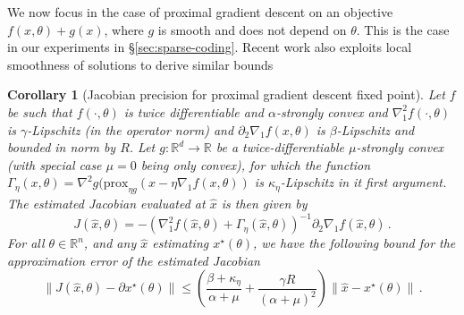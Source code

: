 \documentclass{article}
\def\RR{{\mathbb R}}
\def\prox{{\text{prox}}}
\newtheorem{corollary}{Corollary}
\begin{document}
We now focus in the case of proximal gradient descent on an objective
$f(x,\theta) + g(x)$, where $g$ is smooth and does not depend
on $\theta$. This is the case in our experiments in \S\ref{sec:sparse-coding}.
Recent work also exploits local smoothness of solutions to derive similar bounds
\cite[Theorem 13]{bertrand_2021_journal}

\begin{corollary}[Jacobian precision for proximal gradient descent fixed point]
\label{cor:precision-prox}
    Let $f$ be such that $f(\cdot, \theta)$ is twice differentiable and
    $\alpha$-strongly convex and $\nabla_1^2f(\cdot, \theta)$ is
    $\gamma$-Lipschitz (in the operator norm) and $\partial_2\nabla_1 f(x,
    \theta)$ is $\beta$-Lipschitz and bounded in norm by $R$. Let $g: \RR^d \to
    \RR$ be a twice-differentiable $\mu$-strongly convex (with special case $\mu =0$ being only convex), for which the function
    $\Gamma_\eta(x, \theta) =  \nabla^2 g(\prox_{\eta g}(x - \eta \nabla_1 f(x,
    \theta))$ is $\kappa_\eta$-Lipschitz in it first argument. The estimated Jacobian
    evaluated at $\hat x$ is then given by 
 \[   
 J(\hat x, \theta) = - (\nabla^2_1f(\hat x,
 \theta) + \Gamma_\eta(\hat x, \theta))^{-1} \partial_2\nabla_{1} f(\hat x, \theta)\, .
 \]
 For all $\theta \in \RR^n$, and any $\hat{x}$ estimating $x^\star(\theta)$, we have the following bound for the approximation error of the estimated Jacobian
\[
\|J(\hat x, \theta) - \partial x^\star (\theta)\| \le \left(\frac{\beta + \kappa_\eta}{\alpha + \mu} + \frac{\gamma R}{(\alpha + \mu)^2}\right) \|\hat x - x^\star(\theta)\|\, .
\]
\end{corollary}
\end{document}
